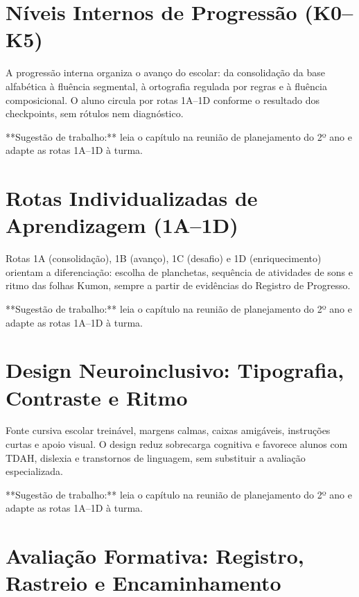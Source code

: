 \chapter{Níveis Internos de Progressão (K0–K5)}

A progressão interna organiza o avanço do escolar: da consolidação da base alfabética à fluência segmental, à ortografia regulada por regras e à fluência composicional. O aluno circula por rotas 1A–1D conforme o resultado dos checkpoints, sem rótulos nem diagnóstico.


\begin{dica}
**Sugestão de trabalho:** leia o capítulo na reunião de planejamento do 2º ano e adapte as rotas 1A–1D à turma.
\end{dica}

\chapter{Rotas Individualizadas de Aprendizagem (1A–1D)}

Rotas 1A (consolidação), 1B (avanço), 1C (desafio) e 1D (enriquecimento) orientam a diferenciação: escolha de planchetas, sequência de atividades de sons e ritmo das folhas Kumon, sempre a partir de evidências do Registro de Progresso.


\begin{dica}
**Sugestão de trabalho:** leia o capítulo na reunião de planejamento do 2º ano e adapte as rotas 1A–1D à turma.
\end{dica}

\chapter{Design Neuroinclusivo: Tipografia, Contraste e Ritmo}

Fonte cursiva escolar treinável, margens calmas, caixas amigáveis, instruções curtas e apoio visual. O design reduz sobrecarga cognitiva e favorece alunos com TDAH, dislexia e transtornos de linguagem, sem substituir a avaliação especializada.


\begin{dica}
**Sugestão de trabalho:** leia o capítulo na reunião de planejamento do 2º ano e adapte as rotas 1A–1D à turma.
\end{dica}

\chapter{Avaliação Formativa: Registro, Rastreio e Encaminhamento}

